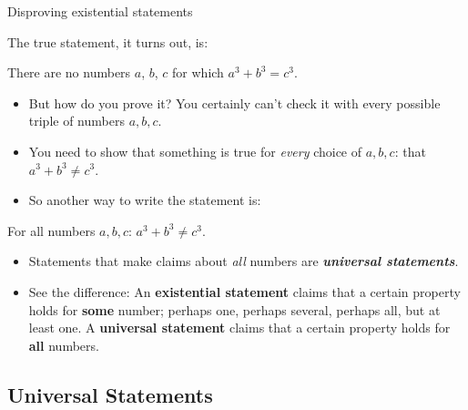 \documentclass[11pt,aspectratio=1610]{beamer}
\begin{document}
\begin{frame}{Disproving existential statements}
		
	The true statement, it turns out, is: \p
		
		
		\begin{theorem}
			There are no numbers $a$, $b$, $c$ for which $a^3 + b^3 = c^3$.			
		\end{theorem}\p
		

			\begin{itemize}
				\item But how do you prove it? You certainly can't check it with every possible triple of numbers $a,b,c$. \p
				\item You need to show that something is true for \emph{every} choice of $a,b,c$: that $a^3 + b^3 \neq c^3$. \p
				\item So another way to write the statement is: 
			\end{itemize}
		
		\begin{theorem}
			For all numbers $a,b,c$: $a^3 + b^3 \neq c^3$.			
		\end{theorem}
		\p
		
	
			\begin{itemize}
				\item Statements that make claims about \textit{all} numbers are \textit{\textbf{universal statements}}. \p
				\item See the difference: An \textbf{existential statement} claims that a certain property holds for \textbf{some} number; perhaps one, perhaps several, perhaps all, but at least one. A \textbf{universal statement} claims that a certain property holds for \textbf{all} numbers. 
			\end{itemize}
		\end{frame}

\subsection{Universal Statements}
		
\end{document}
